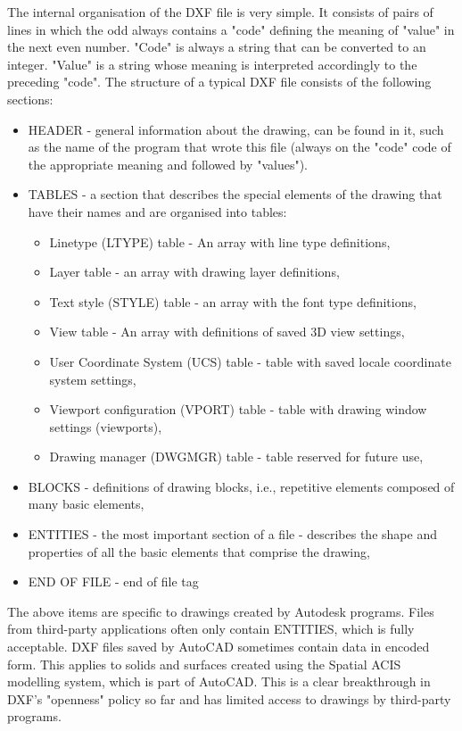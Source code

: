 \documentclass[a4paper, 11pt, article]{report}
\begin{document}
The internal organisation of the DXF file is very simple. It consists of pairs of lines in which the odd always contains a "code" defining the meaning of "value" in the next even number. "Code" is always a string that can be converted to an integer. "Value" is a string whose meaning is interpreted accordingly to the preceding "code".
The structure of a typical DXF file consists of the following sections:

\begin{itemize}
\item HEADER - general information about the drawing, can be found in it, such as the name of the program that wrote this file (always on the "code" code of the appropriate meaning and followed by "values").
\item TABLES - a section that describes the special elements of the drawing that have their names and are organised into tables:

\begin{itemize}
\item Linetype (LTYPE) table - An array with line type definitions,
\item Layer table - an array with drawing layer definitions,
\item Text style (STYLE) table - an array with the font type definitions,
\item View table - An array with definitions of saved 3D view settings,
\item User Coordinate System (UCS) table - table with saved locale coordinate system settings,
\item Viewport configuration (VPORT) table - table with drawing window settings (viewports),
\item Drawing manager (DWGMGR) table - table reserved for future use,
\end{itemize}

\item BLOCKS - definitions of drawing blocks, i.e., repetitive elements composed of many basic elements,
\item ENTITIES - the most important section of a file - describes the shape and properties of all the basic elements that comprise the drawing,
\item END OF FILE - end of file tag
\end{itemize}

The above items are specific to drawings created by Autodesk programs. Files from third-party applications often only contain ENTITIES, which is fully acceptable. DXF files saved by AutoCAD sometimes contain data in encoded form. This applies to solids and surfaces created using the Spatial ACIS modelling system, which is part of AutoCAD. This is a clear breakthrough in DXF's "openness" policy so far and has limited access to drawings by third-party programs.
\end{document}
